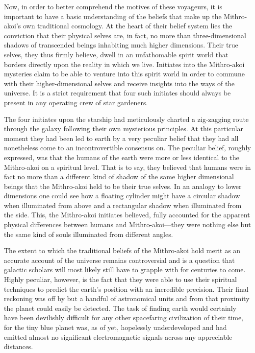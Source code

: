 \documentclass[12pt]{article}
\begin{document}
Now,
in order to better comprehend the motives of these voyageurs,
it is important to have a basic understanding of the beliefs that make up the Mithro-akoi's own traditional cosmology.
At the heart of their belief system lies the conviction that their physical selves are, in fact, no more than three-dimensional shadows of transcended beings inhabiting much higher dimensions.
Their true selves, they thus firmly believe, dwell in an unfathomable spirit world that borders directly upon the reality in which we live.
Initiates into the Mithro-akoi mysteries claim to be able to venture into this spirit world in order to commune with their higher-dimensional selves and receive insights into the ways of the universe.
It is a strict requirement that four such initiates should always be present in any operating crew of star gardeners.

The four initiates upon the starship had meticulously charted a zig-zagging route through the galaxy following their own mysterious principles.
At this particular moment they had been led to earth by a very peculiar belief that they had all nonetheless come to an incontrovertible consensus on.
The peculiar belief, roughly expressed, was that the humans of the earth were more or less identical to the Mithro-akoi on a spiritual level.
That is to say, they believed that humans were in fact no more than a different kind of shadow of the same higher dimensional beings that the Mithro-akoi held to be their true selves.
In an analogy to lower dimensions one could see how a floating cylinder might have a circular shadow when illuminated from above and a rectangular shadow when illuminated from the side.
This, the Mithro-akoi initiates believed, fully accounted for the apparent physical differences between humans and Mithro-akoi---they were nothing else but the same kind of souls illuminated from different angles.

The extent to which the traditional beliefs of the Mithro-akoi hold merit as an accurate account of the universe remains controversial and is a question that galactic scholars will most likely still have to grapple with for centuries to come.
Highly peculiar, however, is the fact that they were able to use their spiritual techniques to predict the earth's position with an incredible precision.
Their final reckoning was off by but a handful of astronomical units and from that proximity the planet could easily be detected.
The task of finding earth would certainly have been devilishly difficult for any other spacefaring civilization of their time, 
for the tiny blue planet was, as of yet, hopelessly underdeveloped and had emitted almost no significant electromagnetic signals across any appreciable distances.
\end{document}
